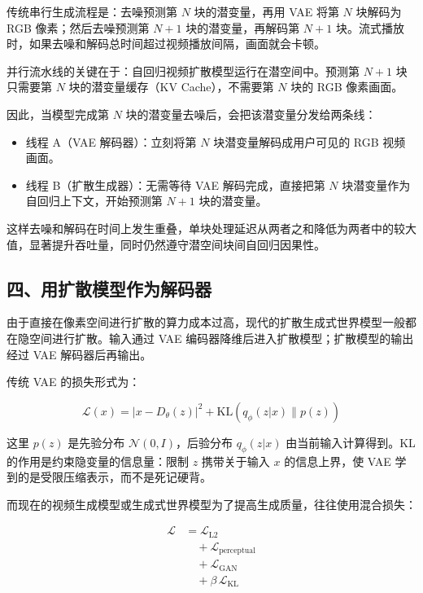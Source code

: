 传统串行生成流程是：去噪预测第 \(N\) 块的潜变量，再用 VAE 将第 \(N\) 块解码为 RGB 像素；然后去噪预测第 \(N+1\) 块的潜变量，再解码第 \(N+1\) 块。流式播放时，如果去噪和解码总时间超过视频播放间隔，画面就会卡顿。

并行流水线的关键在于：自回归视频扩散模型运行在潜空间中。预测第 \(N+1\) 块只需要第 \(N\) 块的潜变量缓存（KV Cache），不需要第 \(N\) 块的 RGB 像素画面。

因此，当模型完成第 \(N\) 块的潜变量去噪后，会把该潜变量分发给两条线：

\begin{itemize}
\tightlist
\item
  线程 A（VAE 解码器）：立刻将第 \(N\) 块潜变量解码成用户可见的 RGB 视频画面。
\item
  线程 B（扩散生成器）：无需等待 VAE 解码完成，直接把第 \(N\) 块潜变量作为自回归上下文，开始预测第 \(N+1\) 块的潜变量。
\end{itemize}

这样去噪和解码在时间上发生重叠，单块处理延迟从两者之和降低为两者中的较大值，显著提升吞吐量，同时仍然遵守潜空间块间自回归因果性。

\hypertarget{ux56dbux7528ux6269ux6563ux6a21ux578bux4f5cux4e3aux89e3ux7801ux5668}{%
\subsection{四、用扩散模型作为解码器}\label{ux56dbux7528ux6269ux6563ux6a21ux578bux4f5cux4e3aux89e3ux7801ux5668}}

由于直接在像素空间进行扩散的算力成本过高，现代的扩散生成式世界模型一般都在隐空间进行扩散。输入通过 VAE 编码器降维后进入扩散模型；扩散模型的输出经过 VAE 解码器后再输出。

传统 VAE 的损失形式为：

\[
\mathcal{L}(x)=|x-D_\theta(z)|^2+\mathrm{KL}(q_\phi(z|x)\|p(z))
\]

这里 \(p(z)\) 是先验分布 \(\mathcal{N}(0,I)\)，后验分布 \(q_\phi(z|x)\) 由当前输入计算得到。KL 的作用是约束隐变量的信息量：限制 \(z\) 携带关于输入 \(x\) 的信息上界，使 VAE 学到的是受限压缩表示，而不是死记硬背。

而现在的视频生成模型或生成式世界模型为了提高生成质量，往往使用混合损失：

\[
\begin{aligned}
\mathcal{L}
&= \mathcal{L}_{\mathrm{L2}}
\\
&\quad + \mathcal{L}_{\mathrm{perceptual}}
\\
&\quad + \mathcal{L}_{\mathrm{GAN}}
\\
&\quad + \beta\,\mathcal{L}_{\mathrm{KL}}
\end{aligned}
\]

